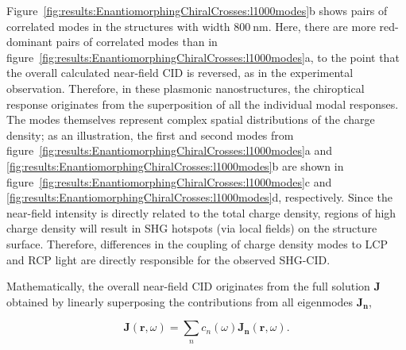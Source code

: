 Figure~\ref{fig:results:EnantiomorphingChiralCrosses:l1000modes}b shows pairs of correlated modes in the structures with width $\SI{800}{\nano\m}$. Here, there are more red-dominant pairs of correlated modes than in figure~\ref{fig:results:EnantiomorphingChiralCrosses:l1000modes}a, to the point that the overall calculated near-field CID is reversed, as in the experimental observation. Therefore, in these plasmonic nanostructures, the chiroptical response originates from the superposition of all the individual modal responses. 
The modes themselves represent complex spatial distributions of the charge density; as an illustration, the first and second modes from figure~\ref{fig:results:EnantiomorphingChiralCrosses:l1000modes}a and \ref{fig:results:EnantiomorphingChiralCrosses:l1000modes}b are shown in figure~\ref{fig:results:EnantiomorphingChiralCrosses:l1000modes}c and \ref{fig:results:EnantiomorphingChiralCrosses:l1000modes}d, respectively.
Since the near-field intensity is directly related to the total charge density, regions of high charge density will result in SHG hotspots (via local fields) on the structure surface. Therefore, differences in the coupling of charge density modes to LCP and RCP light are directly responsible for the observed SHG-CID.

Mathematically, the overall near-field CID originates from the full solution $\mathbf{J}$ obtained by linearly superposing the contributions from all eigenmodes $\mathbf{J_n}$, 

\begin{equation}\label{eq:background:ChiropticalEffects:totalSolution}	
	\mathbf{J} (\mathbf{r}, \omega) = \sum \limits_{n} c_{n}(\omega) \mathbf{J_{n}}(\mathbf{r}, \omega).
\end{equation}

